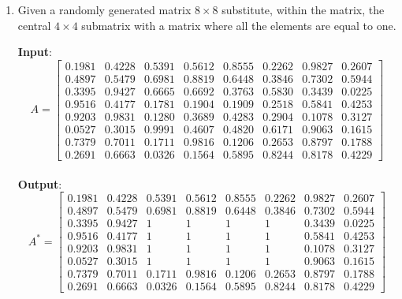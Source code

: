 \documentclass[oneside]{article}
\begin{document}
\begin{enumerate}
   \item Given a randomly generated matrix $8 \times 8$ substitute, within the matrix,
      the central $4 \times 4$ submatrix with a matrix where all the elements are equal
      to one.
      \begin{tcolorbox}[blanker, breakable, left=5mm, before skip=10pt, after skip=10pt,
         borderline west={1mm}{0pt}{bluepoli}]
         \textbf{Input}: \begin{equation*}
            A = \begin{bmatrix}
               0.1981 & 0.4228 & 0.5391 & 0.5612 & 0.8555 & 0.2262 & 0.9827 & 0.2607\\
               0.4897 & 0.5479 & 0.6981 & 0.8819 & 0.6448 & 0.3846 & 0.7302 & 0.5944\\
               0.3395 & 0.9427 & 0.6665 & 0.6692 & 0.3763 & 0.5830 & 0.3439 & 0.0225\\
               0.9516 & 0.4177 & 0.1781 & 0.1904 & 0.1909 & 0.2518 & 0.5841 & 0.4253\\
               0.9203 & 0.9831 & 0.1280 & 0.3689 & 0.4283 & 0.2904 & 0.1078 & 0.3127\\
               0.0527 & 0.3015 & 0.9991 & 0.4607 & 0.4820 & 0.6171 & 0.9063 & 0.1615\\
               0.7379 & 0.7011 & 0.1711 & 0.9816 & 0.1206 & 0.2653 & 0.8797 & 0.1788\\
               0.2691 & 0.6663 & 0.0326 & 0.1564 & 0.5895 & 0.8244 & 0.8178 & 0.4229
            \end{bmatrix}
            \end{equation*}\\
         \textbf{Output}: \begin{equation*}
            A^* = \begin{bmatrix}
               0.1981 & 0.4228 & 0.5391 & 0.5612 & 0.8555 & 0.2262 & 0.9827 & 0.2607\\
               0.4897 & 0.5479 & 0.6981 & 0.8819 & 0.6448 & 0.3846 & 0.7302 & 0.5944\\
               0.3395 & 0.9427 & 1 & 1 & 1 & 1 & 0.3439 & 0.0225\\
               0.9516 & 0.4177 & 1 & 1 & 1 & 1 & 0.5841 & 0.4253\\
               0.9203 & 0.9831 & 1 & 1 & 1 & 1 & 0.1078 & 0.3127\\
               0.0527 & 0.3015 & 1 & 1 & 1 & 1 & 0.9063 & 0.1615\\
               0.7379 & 0.7011 & 0.1711 & 0.9816 & 0.1206 & 0.2653 & 0.8797 & 0.1788\\
               0.2691 & 0.6663 & 0.0326 & 0.1564 & 0.5895 & 0.8244 & 0.8178 & 0.4229
            \end{bmatrix}
            \end{equation*}
      \end{tcolorbox}


\end{enumerate}
\end{document}
